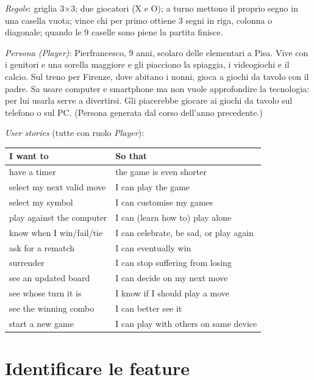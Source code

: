 \begin{esempio}
\emph{Regole}: griglia 3$\times$3; due giocatori (X e O); a turno mettono il proprio segno in una casella vuota; vince
chi per primo ottiene 3 segni in riga, colonna o diagonale; quando le 9 caselle sono piene la partita finisce.

\emph{Persona (Player)}: Pierfrancesco, 9 anni, scolaro delle elementari a Pisa. Vive con i genitori e una sorella
maggiore e gli piacciono la spiaggia, i videogiochi e il calcio. Sul treno per Firenze, dove abitano i nonni, gioca a
giochi da tavolo con il padre. Sa usare computer e smartphone ma non vuole approfondire la tecnologia: per lui usarla
serve a divertirsi. Gli piacerebbe giocare ai giochi da tavolo sul telefono o sul PC. (Persona generata dal corso
dell'anno precedente.)

\emph{User stories} (tutte con ruolo \emph{Player}):

\smallskip
\small
\begin{tabularx}{\linewidth}{>{\raggedright\arraybackslash}p{4.2cm}X}
\toprule
I want to & So that \\
\midrule
have a timer & the game is even shorter \\
select my next valid move & I can play the game \\
select my symbol & I can customise my games \\
play against the computer & I can (learn how to) play alone \\
know when I win/fail/tie & I can celebrate, be sad, or play again \\
ask for a rematch & I can eventually win \\
surrender & I can stop suffering from losing \\
see an updated board & I can decide on my next move \\
see whose turn it is & I know if I should play a move \\
see the winning combo & I can better see it \\
start a new game & I can play with others on same device \\
\bottomrule
\end{tabularx}
\end{esempio}

\section{Identificare le feature}
\label{sec:feature-identificazione}

